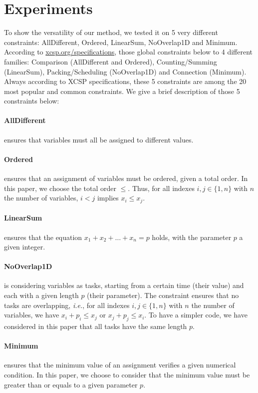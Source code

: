 \documentclass{article}
\newcommand{\ie}{\textit{i.e.}}
\begin{document}
\section{Experiments}\label{sec:xp}

To  show  the versatility  of  our  method, we  tested  it  on 5  very
different constraints:  AllDifferent, Ordered,  LinearSum, NoOverlap1D
and                Minimum.                According                to
\href{http://xcsp.org/specifications}{xcsp.org/specifications},  those
global  constraints   below  to   4  different   families:  Comparison
(AllDifferent    and     Ordered),    Counting/Summing    (LinearSum),
Packing/Scheduling  (NoOverlap1D)  and Connection  (Minimum).   Always
according to XCSP specifications, these 5 constraints are among the 20
most popular  and common constraints.  We give a brief  description of
those 5 constraints below:

\paragraph{AllDifferent} ensures  that variables must all  be assigned
to different values.
\paragraph{Ordered} ensures  that an  assignment of variables  must be
ordered, given a total order. In this paper, we choose the total order
$\leq$. Thus, for all indexes $i,j \in \{1,n\}$ with $n$ the number of
variables, $i < j$ implies $x_i \leq x_j$.
\paragraph{LinearSum}       ensures       that      the       equation
$x_1 + x_2 +  \ldots + x_n = p$ holds, with the  parameter $p$ a given
integer.
\paragraph{NoOverlap1D}  is considering  variables as  tasks, starting
from a  certain time (their  value) and each  with a given  length $p$
(their  parameter).    The  constraint  ensures  that   no  tasks  are
overlapping,  \ie, for  all indexes  $i,j  \in \{1,n\}$  with $n$  the
number   of   variables,  we   have   $x_i   +   p_i  \leq   x_j$   or
$x_j + p_j \leq  x_i$.  To have a simpler code,  we have considered in
this paper that all tasks have the same length $p$.
\paragraph{Minimum} ensures  that the  minimum value of  an assignment
verifies  a given  numerical condition.  In this  paper, we  choose to
consider that  the minimum value must  be greater than or  equals to a
given parameter $p$.
\end{document}
